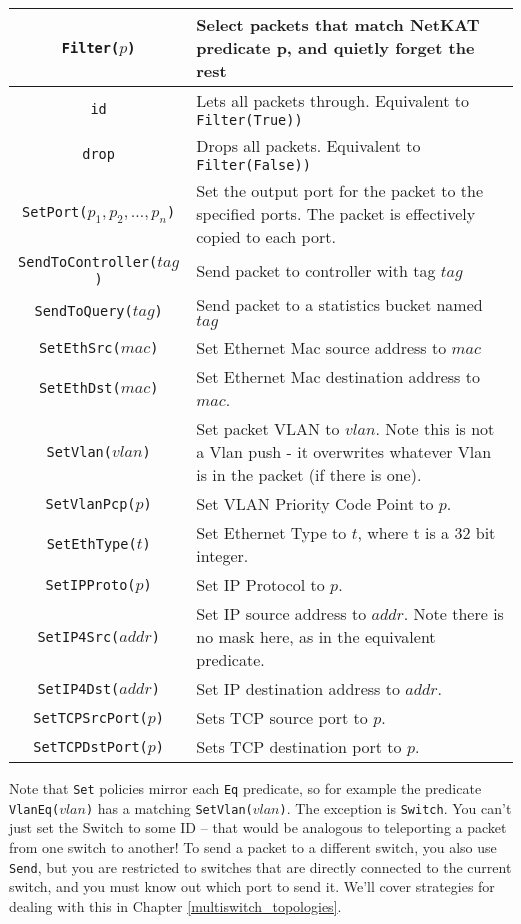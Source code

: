 \bigskip
\begin{tabularx}{\linewidth}{|c|X|}
\hline\hline
\texttt{Filter($p$)} & Select packets that match NetKAT predicate p, and quietly forget the rest  
\\ \hline
\texttt{id} & Lets all packets through.  Equivalent to \texttt{Filter(True))}  
\\ \hline
\texttt{drop} & Drops all packets.  Equivalent to \texttt{Filter(False))}  
\\ \hline
\texttt{SetPort($p_1, p_2, \ldots, p_n$)} & Set the output port for the packet to the specified ports.
The packet is effectively copied to each port.    
\\ \hline
\texttt{SendToController($tag$)} & Send packet to controller with tag $tag$    
\\ \hline
\texttt{SendToQuery($tag$)} & Send packet to a statistics bucket named $tag$    
\\ \hline
\texttt{SetEthSrc($mac$)} & Set Ethernet Mac source address to $mac$
\\ \hline
\texttt{SetEthDst($mac$)} & Set Ethernet Mac destination address to $mac$.
\\ \hline
\texttt{SetVlan($vlan$)} & Set packet VLAN to $vlan$.  Note this is not a Vlan push - it overwrites whatever 
Vlan is in the packet (if there is one).  
\\ \hline
\texttt{SetVlanPcp($p$)} & Set VLAN Priority Code Point to $p$.
\\ \hline
\texttt{SetEthType($t$)} & Set Ethernet Type to $t$, where t is a 32 bit integer.
\\ \hline
\texttt{SetIPProto($p$)} & Set IP Protocol to $p$.    
\\ \hline
\texttt{SetIP4Src($addr$)} & Set IP source address to $addr$.  
Note there is no mask here, as in the equivalent predicate.  
\\ \hline
\texttt{SetIP4Dst($addr$)} & Set IP destination address to $addr$.  
\\ \hline
\texttt{SetTCPSrcPort($p$)} & Sets TCP source port to $p$.
\\ \hline
\texttt{SetTCPDstPort($p$)} & Sets TCP destination port to $p$.  
\\ \hline\hline
\end{tabularx}
\bigskip

Note that \texttt{Set} policies mirror each \texttt{Eq} predicate, so for example the 
predicate \texttt{VlanEq($vlan$)} has a matching
\texttt{SetVlan($vlan$)}.
The exception is \texttt{Switch}.  
You can't just set the Switch to some ID -- that would be analogous to teleporting a packet from one 
switch to another!
To send a packet to a different switch, you also use \texttt{Send}, but you are restricted to switches that are directly
connected to the current switch, and you must know out which port to send it.
We'll cover strategies for dealing with this in Chapter \ref{multiswitch_topologies}.
 
